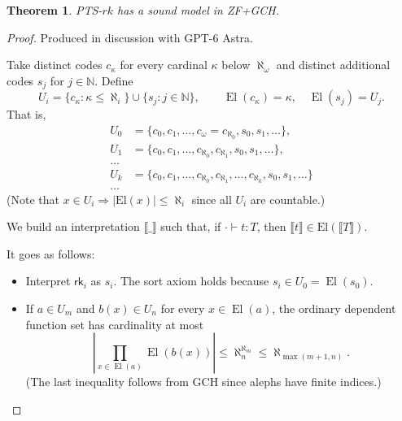 \documentclass{article}
\newtheorem{theorem}{Theorem}
\theoremstyle{definition}
\theoremstyle{remark}
\begin{document}
\begin{theorem}
    PTS-$rk$ has a sound model in ZF+GCH.
\end{theorem}
\begin{proof}
    Produced in discussion with GPT-6 Astra.

    Take distinct codes \(c_\kappa\) for every cardinal
    $\kappa$ below \(\aleph_\omega\) and distinct
    additional codes \(s_j\) for \(j\in\mathbb N\).
    Define
    \[
        U_i=\{c_\kappa:\kappa\le\aleph_i\}\cup
            \{s_j:j\in\mathbb N\},
        \qquad
        \operatorname{El}(c_\kappa)=\kappa,\quad
        \operatorname{El}(s_j)=U_j.
    \]
    That is,
    \begin{align*}
        U_0 &= \{c_0,c_1,\ldots,c_\omega=c_{\aleph_0},
                s_0,s_1,\ldots\},\\
        U_1 &= \{c_0,c_1,\ldots,c_{\aleph_0},
                c_{\aleph_1},s_0,s_1,\ldots\},\\
        \ldots\\
        U_k &= \{
            c_0,c_1,\ldots,c_{\aleph_0},
            c_{\aleph_1},\ldots,c_{\aleph_k},
            s_0,s_1,\ldots\}\\
        \ldots
    \end{align*}
    (Note that $x\in U_i\Rightarrow|\mathrm{El}(x)|\le
    \aleph_i$ since all $U_i$ are countable.)

    We build an interpretation $\llbracket\_\rrbracket$
    such that, if $\cdot\vdash t:T$, then
    $\llbracket t\rrbracket\in\mathrm{El}(\llbracket T
    \rrbracket)$.

    It goes as follows:
    \begin{itemize}
        \item Interpret \(\mathsf{rk}_i\) as \(s_i\).
            The sort axiom holds because
            \(s_i\in U_0=\operatorname{El}(s_0)\).
        \item If \(a\in U_m\) and \(b(x)\in U_n\) for
            every \(x\in\operatorname{El}(a)\), the
            ordinary dependent function set has
            cardinality at most
            \[
                \left|\prod_{x\in\operatorname{El}(a)}
                \operatorname{El}(b(x))\right|
                \le \aleph_n^{\aleph_m}
                \le \aleph_{\max(m+1,n)}.
            \]
            (The last inequality follows from GCH since
            alephs have finite indices.)


\end{itemize}
\end{proof}
\end{document}
